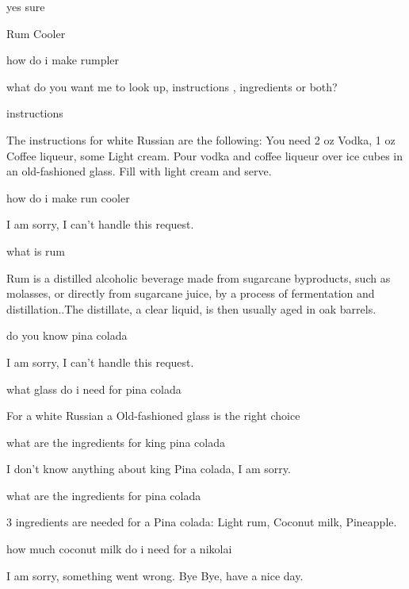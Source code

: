 \documentclass[12pt,letterpaper]{article}
\begin{document}
\begin{dialogue}
 yes sure

 Rum Cooler

 how do i make rumpler

 what do you want me to look up, instructions , ingredients or both?

 instructions

 The instructions for white Russian are the following: You need 2 oz Vodka, 1 oz Coffee liqueur, some Light cream. Pour vodka and coffee liqueur over ice cubes in an old-fashioned glass. Fill with light cream and serve.

 how do i make run cooler\\

I am sorry, I can't handle this request.

 what is rum

 Rum is a distilled alcoholic beverage made from sugarcane byproducts, such as molasses, or directly from sugarcane juice, by a process of fermentation and distillation..The distillate, a clear liquid, is then usually aged in oak barrels.

 do you know pina colada\\

 I am sorry, I can't handle this request.

 what glass do i need for pina colada\\

 For a white Russian a Old-fashioned glass is the right choice

 what are the ingredients for king pina colada\\

 I don't know anything about king Pina colada, I am sorry.\\

 what are the ingredients for pina colada

 3 ingredients are needed for a Pina colada: Light rum, Coconut milk, Pineapple.

 how much coconut milk do i need for a nikolai\\

 I am sorry, something went wrong.
 Bye
 Bye, have a nice day.
\end{dialogue}
\end{document}
